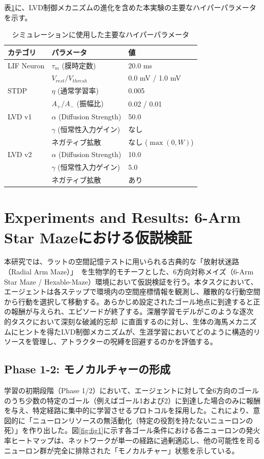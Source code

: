 \documentclass[submit]{ipsj}
\begin{document}
表\ref{tab:hyperparams}に、LVD制御メカニズムの進化を含めた本実験の主要なハイパーパラメータを示す。

\begin{table}[htbp]
\centering
\caption{シミュレーションに使用した主要なハイパーパラメータ}
\label{tab:hyperparams}
\begin{tabular}{lll}
\toprule
カテゴリ & パラメータ & 値 \\ \midrule
LIF Neuron & $\tau_m$ (膜時定数) & 20.0 ms \\ 
 & $V_{rest} / V_{thresh}$ & 0.0 mV / 1.0 mV \\ \midrule
STDP & $\eta$ (通常学習率) & 0.005 \\ 
 & $A_+ / A_-$ (振幅比) & 0.02 / 0.01 \\ \midrule
LVD v1 & $\alpha$ (Diffusion Strength) & 50.0 \\ 
 & $\gamma$ (恒常性入力ゲイン) & なし \\
 & ネガティブ拡散 & なし ($\max(0, W)$) \\ \midrule
LVD v2 & $\alpha$ (Diffusion Strength) & 10.0 \\ 
 & $\gamma$ (恒常性入力ゲイン) & 5.0 \\
 & ネガティブ拡散 & あり \\ \bottomrule
\end{tabular}
\end{table}

\section{Experiments and Results: 6-Arm Star Mazeにおける仮説検証}

本研究では、ラットの空間記憶テストに用いられる古典的な「放射状迷路（Radial Arm Maze）」~\cite{olton1976spatial}を生物学的モチーフとした、6方向対称メイズ（6-Arm Star Maze / Hexable-Maze）環境において仮説検証を行う。本タスクにおいて、エージェントは各ステップで環境内の空間座標情報を観測し、離散的な行動空間から行動を選択して移動する。あらかじめ設定されたゴール地点に到達すると正の報酬が与えられ、エピソードが終了する。深層学習モデルがこのような逐次的タスクにおいて深刻な破滅的忘却~\cite{mccloskey1989catastrophic}に直面するのに対し、生体の海馬メカニズムにヒントを得たLVD制御メカニズムが、生涯学習においてどのように構造的リソースを管理し、アトラクターの呪縛を回避するのかを評価する。

\subsection{Phase 1-2: モノカルチャーの形成}
学習の初期段階（Phase 1/2）において、エージェントに対して全6方向のゴールのうち少数の特定のゴール（例えばゴール1および2）に到達した場合のみに報酬を与え、特定経路に集中的に学習させるプロトコルを採用した。これにより、意図的に「ニューロンリソースの無活動化（特定の役割を持たないニューロンの死）」を作り出した。図\ref{fig:fig1}に示す各ゴール条件における各ニューロンの発火率ヒートマップは、ネットワークが単一の経路に過剰適応し、他の可能性を司るニューロン群が完全に排除された「モノカルチャー」状態を示している。
\end{document}
